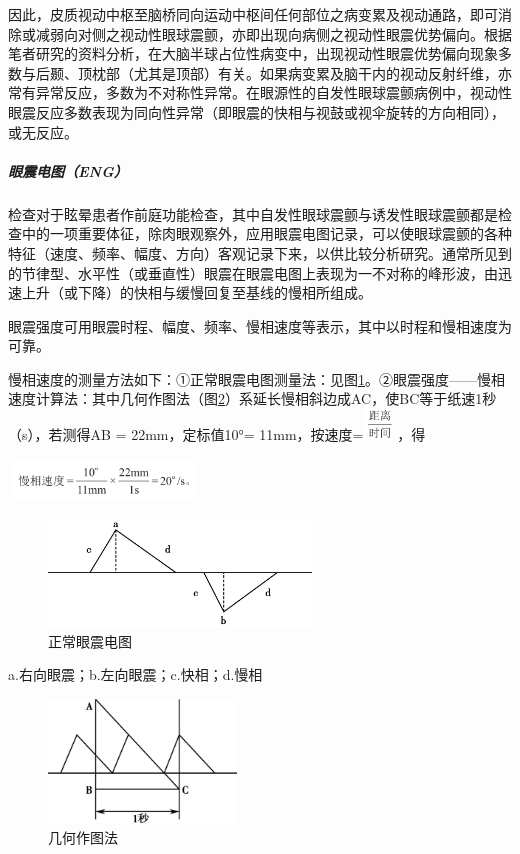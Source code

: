 因此，皮质视动中枢至脑桥同向运动中枢间任何部位之病变累及视动通路，即可消除或减弱向对侧之视动性眼球震颤，亦即出现向病侧之视动性眼震优势偏向。根据笔者研究的资料分析，在大脑半球占位性病变中，出现视动性眼震优势偏向现象多数与后颞、顶枕部（尤其是顶部）有关。如果病变累及脑干内的视动反射纤维，亦常有异常反应，多数为不对称性异常。在眼源性的自发性眼球震颤病例中，视动性眼震反应多数表现为同向性异常（即眼震的快相与视鼓或视伞旋转的方向相同），或无反应。

\subparagraph{眼震电图（ENG）}

检查对于眩晕患者作前庭功能检查，其中自发性眼球震颤与诱发性眼球震颤都是检查中的一项重要体征，除肉眼观察外，应用眼震电图记录，可以使眼球震颤的各种特征（速度、频率、幅度、方向）客观记录下来，以供比较分析研究。通常所见到的节律型、水平性（或垂直性）眼震在眼震电图上表现为一不对称的峰形波，由迅速上升（或下降）的快相与缓慢回复至基线的慢相所组成。

眼震强度可用眼震时程、幅度、频率、慢相速度等表示，其中以时程和慢相速度为可靠。

慢相速度的测量方法如下：①正常眼震电图测量法：见图\ref{fig3-1}。②眼震强度------慢相速度计算法：其中几何作图法（图\ref{fig3-2}）系延长慢相斜边成AC，使BC等于纸速1秒（s），若测得AB
= 22mm，定标值10°=
11mm，按速度=\includegraphics[width=0.30208in,height=0.32292in]{./images/Image00009.jpg}
，得

\includegraphics[width=1.95833in,height=0.42708in]{./images/Image00010.jpg}

\begin{figure}[!htbp]
 \centering
 \includegraphics[width=2.75in,height=1.13542in]{./images/Image00011.jpg}
 \captionsetup{justification=centering}
 \caption{正常眼震电图}
 \label{fig3-1}
  \end{figure} 

a.右向眼震；b.左向眼震；c.快相；d.慢相

\begin{figure}[!htbp]
 \centering
 \includegraphics[width=1.96875in,height=1.29167in]{./images/Image00012.jpg}
 \captionsetup{justification=centering}
 \caption{几何作图法}
 \label{fig3-2}
  \end{figure} 

